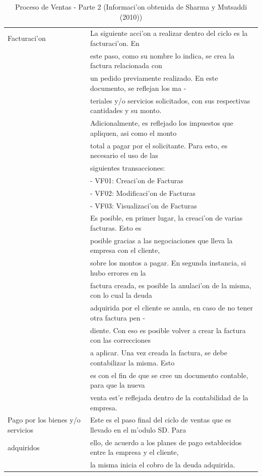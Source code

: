 \begin{table}[H]
\begin{tabular}{|l|l|}
Facturaci'on             							  & La siguiente acci'on a realizar dentro del ciclo es la facturaci'on. En\\ 
															  & este paso, como su nombre lo indica, se crea la factura relacionada con\\ 
															  & un pedido previamente realizado. En este documento, se reflejan los ma -\\
															  & teriales y/o servicios solicitados, con sus respectivas cantidades y su monto.\\ 
															  & Adicionalmente, es  reflejado los impuestos que apliquen, asi como  el monto\\
															  & total a pagar por el solicitante. Para esto, es necesario el uso de las\\ 
															  & siguientes transacciones:\\
															  & - VF01: Creaci'on de Facturas\\
															  & - VF02: Modificaci'on de Facturas\\
															  & - VF03: Visualizaci'on de Facturas\\
															  & Es posible, en primer lugar, la creaci'on de varias facturas. Esto es\\ 
															  & posible gracias a las negociaciones que lleva la empresa con el cliente,\\
															  &  sobre los montos a pagar. En segunda instancia, si hubo errores en la\\
															  &  factura creada, es posible la anulaci'on de la misma, con lo cual la deuda\\ 
															  & adquirida por el cliente se anula, en caso de no tener otra factura pen -\\  
															  & diente. Con eso es posible volver a crear la factura con las correcciones\\
															  &  a aplicar. Una vez creada la factura, se debe contabilizar la misma. Esto\\
															  & es con el fin de que se cree un documento contable, para que la nueva\\ 
															  & venta est'e reflejada dentro de la contabilidad de la empresa.\\
\hline
Pago por los bienes y/o servicios& Este es el paso final del ciclo de ventas que es  llevado en el m'odulo SD. Para\\ 
adquiridos				                    & ello, de acuerdo a los planes de pago establecidos entre la empresa y el cliente,\\ 
                                                   & la misma inicia el cobro de la deuda adquirida.\\
\hline
\end{tabular}
\caption{Proceso de Ventas - Parte 2 (Informaci'on obtenida de Sharma y Mutsaddi (2010))}
\label{tb:procesosd3}
\end{table}

